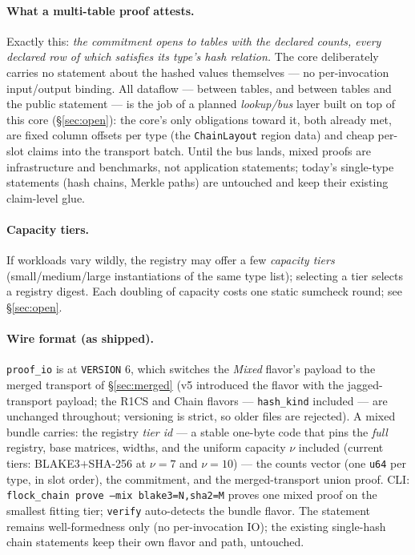 \documentclass[11pt]{article}
\newcommand{\code}[1]{\texttt{#1}}
\theoremstyle{definition}
\begin{document}
\paragraph{What a multi-table proof attests.} Exactly this: \emph{the
commitment opens to tables with the declared counts, every declared row of
which satisfies its type's hash relation.} The core deliberately carries
no statement about the hashed values themselves --- no per-invocation
input/output binding. All dataflow --- between tables, and between tables
and the public statement --- is the job of a planned \emph{lookup/bus}
layer built on top of this core (\S\ref{sec:open}): the core's only
obligations toward it, both already met, are fixed column offsets per type
(the \code{ChainLayout} region data) and cheap per-slot claims into the
transport batch. Until the bus lands, mixed proofs are infrastructure and
benchmarks, not application statements; today's single-type statements
(hash chains, Merkle paths) are untouched and keep their existing
claim-level glue.

\paragraph{Capacity tiers.} If workloads vary wildly, the registry may
offer a few \emph{capacity tiers} (small/medium/large instantiations of the
same type list); selecting a tier selects a registry digest. Each doubling
of capacity costs one static sumcheck round; see \S\ref{sec:open}.

\paragraph{Wire format (as shipped).} \code{proof\_io} is at
\code{VERSION} 6, which switches the \emph{Mixed} flavor's payload to
the merged transport of \S\ref{sec:merged} (v5 introduced the flavor
with the jagged-transport payload; the R1CS and Chain flavors ---
\code{hash\_kind} included --- are unchanged throughout; versioning is
strict, so older files are rejected). A mixed
bundle carries: the registry \emph{tier id} --- a stable one-byte code
that pins the \emph{full} registry, base matrices, widths, and the uniform
capacity $\nu$ included (current tiers: BLAKE3$+$SHA-256 at $\nu = 7$ and
$\nu = 10$) --- the counts vector (one \code{u64} per type, in slot
order), the commitment, and the merged-transport union proof. CLI: \code{flock\_chain
prove --mix blake3=N,sha2=M} proves one mixed proof on the smallest
fitting tier; \code{verify} auto-detects the bundle flavor. The statement
remains well-formedness only (no per-invocation IO); the existing
single-hash chain statements keep their own flavor and path, untouched.
\end{document}

